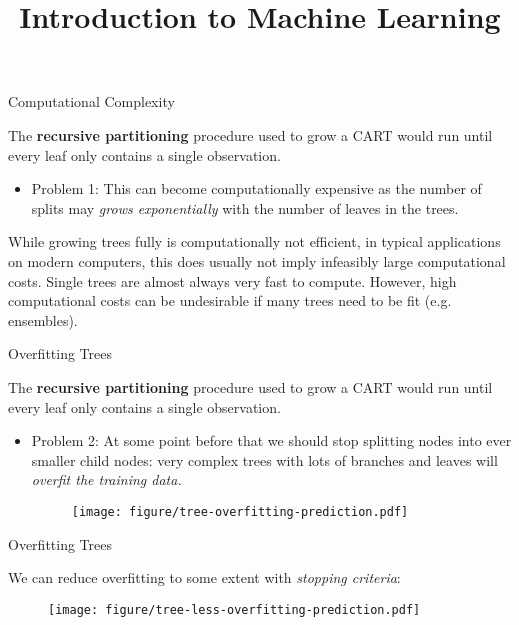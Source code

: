 \documentclass[11pt,compress,t,notes=noshow, xcolor=table]{beamer}
\title{Introduction to Machine Learning}
\institute{\href{https://compstat-lmu.github.io/lecture_i2ml/}{compstat-lmu.github.io/lecture\_i2ml}}
\date{}
\begin{document}
\sloppy

\begin{vbframe}{Computational Complexity}

The \textbf{recursive partitioning} procedure used to grow a CART would run until every leaf only contains a single observation. 
\begin{itemize}
\item Problem 1: This can become computationally expensive as the number of splits may \emph{grows exponentially} with the number of leaves in the trees.
\end{itemize}

While growing trees fully is computationally not efficient, in typical applications on modern computers, this does usually not imply infeasibly large computational costs.
Single trees are almost always very fast to compute.
However, high computational costs can be undesirable if many trees need to be fit (e.g. ensembles).

\end{vbframe}

\begin{vbframe}{Overfitting Trees}

The \textbf{recursive partitioning} procedure used to grow a CART would run until every leaf only contains a single observation. 
\begin{itemize}
\item Problem 2: At some point before that we should stop splitting nodes into ever smaller child nodes: very complex trees with lots of branches and leaves will \emph{overfit the training data.}

\begin{figure}
\centering
\texttt{[image: figure/tree-overfitting-prediction.pdf]}
\end{figure}

\end{itemize}

\end{vbframe}

\begin{vbframe}{Overfitting Trees}

We can reduce overfitting to some extent with \emph{stopping criteria}:
\vspace{0.25cm}

\begin{figure}
\centering
\texttt{[image: figure/tree-less-overfitting-prediction.pdf]}
\end{figure}

\end{vbframe}
\end{document}
